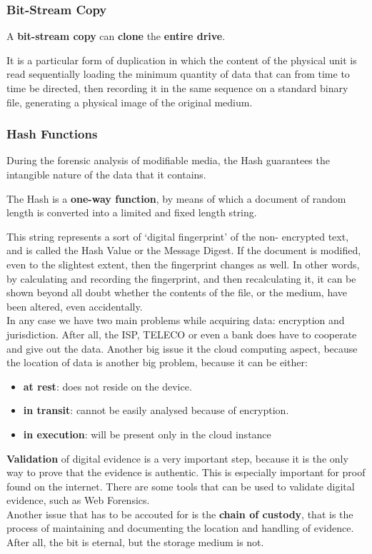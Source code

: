 \subsubsection{Bit-Stream Copy}
\begin{boxH}
  A \textbf{bit-stream copy} can \textbf{clone} the \textbf{entire
  drive}.
\end{boxH}
It is a particular form of duplication in which the content of the
physical unit is read sequentially loading the minimum quantity of
data that can from time to time be directed, then recording it in the
same sequence on a standard binary file, generating a physical image
of the original medium.

\subsubsection{Hash Functions}
During the forensic analysis of modifiable media, the Hash 
guarantees the intangible nature of the data that it contains.
\begin{boxH}
  The Hash is a \textbf{one-way function}, by means of which a
  document of random length is converted into a limited and fixed
  length string.
\end{boxH}
This string represents a sort of ‘digital fingerprint’ of the non-
encrypted text, and is called the Hash Value or the Message Digest. If
the document is modified, even to the slightest extent, then the
fingerprint changes as well. In other words, by calculating and
recording the fingerprint, and then recalculating it, it can be shown
beyond all doubt whether the contents of the file, or the medium, have
been altered, even accidentally.\\

In any case we have two main problems while acquiring data: encryption
and jurisdiction. After all, the ISP, TELECO or even a bank does have
to cooperate and give out the data. Another big issue it the cloud
computing aspect, because the location of data is another big problem,
because it can be either:
\begin{itemize}
  \item \textbf{at rest}: does not reside on the device. 
  \item \textbf{in transit}: cannot be easily analysed because of
    encryption. 
  \item \textbf{in execution}: will be present only in the cloud
    instance
\end{itemize}
\textbf{Validation} of digital evidence is a very important step,
because it is the only way to prove that the evidence is authentic.
This is especially important for proof found on the internet. There
are some tools that can be used to validate digital evidence, such as
Web Forensics.\\
Another issue that has to be accouted for is the \textbf{chain of
custody}, that is the process of maintaining and documenting the
location and handling of evidence. After all, the bit is eternal, but
the storage medium is not.
